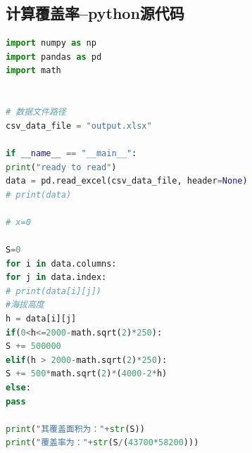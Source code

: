\documentclass{whutmod}
\begin{document}
\subsection{计算覆盖率--python源代码}
\begin{lstlisting}[language=python]
import numpy as np
import pandas as pd
import math


# 数据文件路径
csv_data_file = "output.xlsx"

if __name__ == "__main__":
print("ready to read")
data = pd.read_excel(csv_data_file, header=None)
# print(data)

# x=0

S=0
for i in data.columns:
for j in data.index:
# print(data[i][j])
#海拔高度
h = data[i][j]
if(0<h<=2000-math.sqrt(2)*250):
S += 500000
elif(h > 2000-math.sqrt(2)*250):
S += 500*math.sqrt(2)*(4000-2*h)
else:
pass

print("其覆盖面积为："+str(S))
print("覆盖率为："+str(S/(43700*58200)))

\end{lstlisting}
\end{document}
